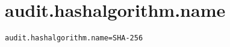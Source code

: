 \section{audit.hashalgorithm.name}
\label{configuration:AuditHashalgorithmName}
\ClearAPI
\TODO
{}
\begin{lstlisting}[style=Props,caption={Usage example for \textit{audit.hashalgorithm.name}}]
audit.hashalgorithm.name=SHA-256
\end{lstlisting}